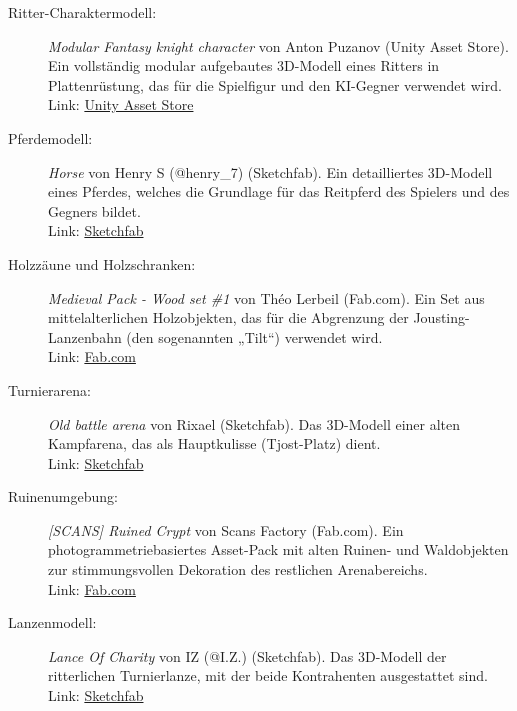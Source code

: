 \documentclass[11pt, a4paper]{article}
\begin{document}
\begin{description}
    \item[Ritter-Charaktermodell:] \textit{Modular Fantasy knight character} von Anton Puzanov (Unity Asset Store). 
    Ein vollständig modular aufgebautes 3D-Modell eines Ritters in Plattenrüstung, das für die Spielfigur und den KI-Gegner verwendet wird. \\
    Link: \href{https://assetstore.unity.com/packages/3d/characters/humanoids/fantasy/modular-fantasy-knight-character-276754}{Unity Asset Store}
    
    \item[Pferdemodell:] \textit{Horse} von Henry S (@henry\_7) (Sketchfab).
    Ein detailliertes 3D-Modell eines Pferdes, welches die Grundlage für das Reitpferd des Spielers und des Gegners bildet. \\
    Link: \href{https://sketchfab.com/3d-models/horse-a6f860e43e364619bccb174a1ac7d0c9}{Sketchfab}
    
    \item[Holzzäune und Holzschranken:] \textit{Medieval Pack - Wood set \#1} von Théo Lerbeil (Fab.com).
    Ein Set aus mittelalterlichen Holzobjekten, das für die Abgrenzung der Jousting-Lanzenbahn (den sogenannten „Tilt“) verwendet wird. \\
    Link: \href{https://www.fab.com/listings/cd1e2cdd-f399-4a68-a7f7-e842e2e26852}{Fab.com}
    
    \item[Turnierarena:] \textit{Old battle arena} von Rixael (Sketchfab).
    Das 3D-Modell einer alten Kampfarena, das als Hauptkulisse (Tjost-Platz) dient. \\
    Link: \href{https://sketchfab.com/3d-models/old-battle-arena-9dad465609334aef8f1d99c37a30c940}{Sketchfab}
    
    \item[Ruinenumgebung:] \textit{[SCANS] Ruined Crypt} von Scans Factory (Fab.com).
    Ein photogrammetriebasiertes Asset-Pack mit alten Ruinen- und Waldobjekten zur stimmungsvollen Dekoration des restlichen Arenabereichs. \\
    Link: \href{https://www.fab.com/listings/ea85f730-1f39-4b15-8a69-60975d3b39a7}{Fab.com}
    
    \item[Lanzenmodell:] \textit{Lance Of Charity} von IZ (@I.Z.) (Sketchfab).
    Das 3D-Modell der ritterlichen Turnierlanze, mit der beide Kontrahenten ausgestattet sind. \\
    Link: \href{https://sketchfab.com/3d-models/lance-of-charity-e2b7e77ca95f468b99d7941ad5bf80f1}{Sketchfab}
\end{description}
\end{document}
